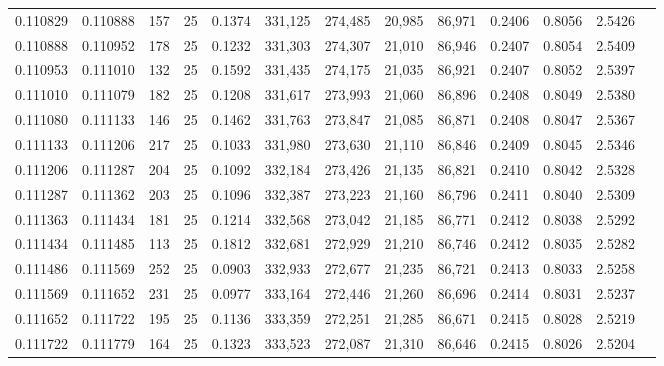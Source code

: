 \begin{tabular}{rrrrrrrrrrrrr}
0.110829 & 0.110888 &   157 &  25 &                                     0.1374 & 331,125 & 274,485 &  20,985 &  86,971 & 0.2406 & 0.8056 & 2.5426 \\
0.110888 & 0.110952 &   178 &  25 &                                     0.1232 & 331,303 & 274,307 &  21,010 &  86,946 & 0.2407 & 0.8054 & 2.5409 \\
0.110953 & 0.111010 &   132 &  25 &                                     0.1592 & 331,435 & 274,175 &  21,035 &  86,921 & 0.2407 & 0.8052 & 2.5397 \\
0.111010 & 0.111079 &   182 &  25 &                                     0.1208 & 331,617 & 273,993 &  21,060 &  86,896 & 0.2408 & 0.8049 & 2.5380 \\
0.111080 & 0.111133 &   146 &  25 &                                     0.1462 & 331,763 & 273,847 &  21,085 &  86,871 & 0.2408 & 0.8047 & 2.5367 \\
0.111133 & 0.111206 &   217 &  25 &                                     0.1033 & 331,980 & 273,630 &  21,110 &  86,846 & 0.2409 & 0.8045 & 2.5346 \\
0.111206 & 0.111287 &   204 &  25 &                                     0.1092 & 332,184 & 273,426 &  21,135 &  86,821 & 0.2410 & 0.8042 & 2.5328 \\
0.111287 & 0.111362 &   203 &  25 &                                     0.1096 & 332,387 & 273,223 &  21,160 &  86,796 & 0.2411 & 0.8040 & 2.5309 \\
0.111363 & 0.111434 &   181 &  25 &                                     0.1214 & 332,568 & 273,042 &  21,185 &  86,771 & 0.2412 & 0.8038 & 2.5292 \\
0.111434 & 0.111485 &   113 &  25 &                                     0.1812 & 332,681 & 272,929 &  21,210 &  86,746 & 0.2412 & 0.8035 & 2.5282 \\
0.111486 & 0.111569 &   252 &  25 &                                     0.0903 & 332,933 & 272,677 &  21,235 &  86,721 & 0.2413 & 0.8033 & 2.5258 \\
0.111569 & 0.111652 &   231 &  25 &                                     0.0977 & 333,164 & 272,446 &  21,260 &  86,696 & 0.2414 & 0.8031 & 2.5237 \\
0.111652 & 0.111722 &   195 &  25 &                                     0.1136 & 333,359 & 272,251 &  21,285 &  86,671 & 0.2415 & 0.8028 & 2.5219 \\
0.111722 & 0.111779 &   164 &  25 &                                     0.1323 & 333,523 & 272,087 &  21,310 &  86,646 & 0.2415 & 0.8026 & 2.5204 \\

\end{tabular}
